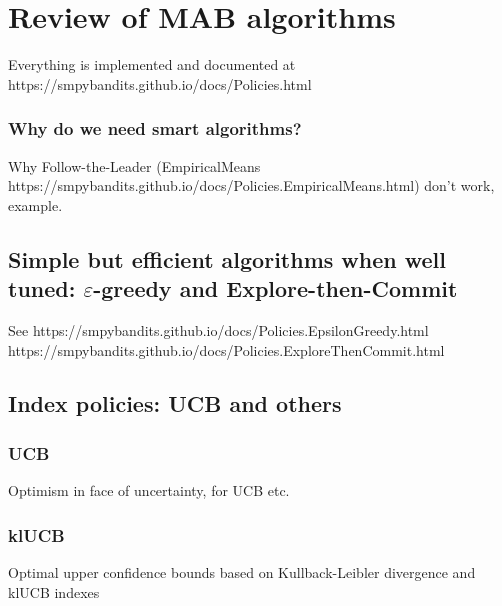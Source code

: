 \section{Review of MAB algorithms}
\label{sec:2:famousMABalgorithms}

Everything is implemented and documented at
https://smpybandits.github.io/docs/Policies.html


\subsubsection{Why do we need smart algorithms?}
Why Follow-the-Leader (EmpiricalMeans https://smpybandits.github.io/docs/Policies.EmpiricalMeans.html) don't work, example.

\subsection{Simple but efficient algorithms when well tuned: $\varepsilon$-greedy and Explore-then-Commit}

See
https://smpybandits.github.io/docs/Policies.EpsilonGreedy.html
https://smpybandits.github.io/docs/Policies.ExploreThenCommit.html


\subsection{Index policies: UCB and others}



\subsubsection{UCB}
Optimism in face of uncertainty, for UCB etc.


\subsubsection{klUCB}
Optimal upper confidence bounds based on Kullback-Leibler divergence and klUCB indexes


